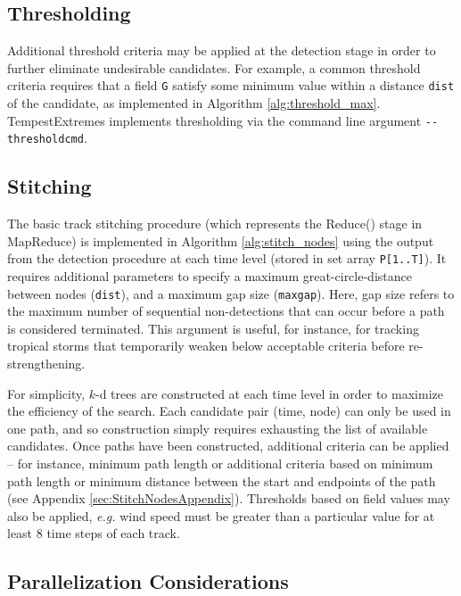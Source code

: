 \documentclass[gmdd, hvmath]{copernicus}
\begin{document}
\subsection{Thresholding}

Additional threshold criteria may be applied at the detection stage in order to further eliminate undesirable candidates.  For example, a common threshold criteria requires that a field \texttt{G} satisfy some minimum value within a distance \texttt{dist} of the candidate, as implemented in Algorithm \ref{alg:threshold_max}.  TempestExtremes implements thresholding via the command line argument \texttt{-\;\!\!-thresholdcmd}.

\subsection{Stitching}

The basic track stitching procedure (which represents the Reduce() stage in MapReduce) is implemented in Algorithm \ref{alg:stitch_nodes} using the output from the detection procedure at each time level (stored in set array \texttt{P[1..T]}).  It requires additional parameters to specify a maximum great-circle-distance between nodes (\texttt{dist}), and a maximum gap size (\texttt{maxgap}).  Here, gap size refers to the maximum number of sequential non-detections that can occur before a path is considered terminated.  This argument is useful, for instance, for tracking tropical storms that temporarily weaken below acceptable criteria before re-strengthening.

For simplicity, $k$-d trees are constructed at each time level in order to maximize the efficiency of the search.  Each candidate pair (time, node) can only be used in one path, and so construction simply requires exhausting the list of available candidates.  Once paths have been constructed, additional criteria can be applied -- for instance, minimum path length or additional criteria based on minimum path length or minimum distance between the start and endpoints of the path (see Appendix \ref{sec:StitchNodesAppendix}).  Thresholds based on field values may also be applied, \textit{e.g.} wind speed must be greater than a particular value for at least 8 time steps of each track.

\subsection{Parallelization Considerations}
\end{document}

